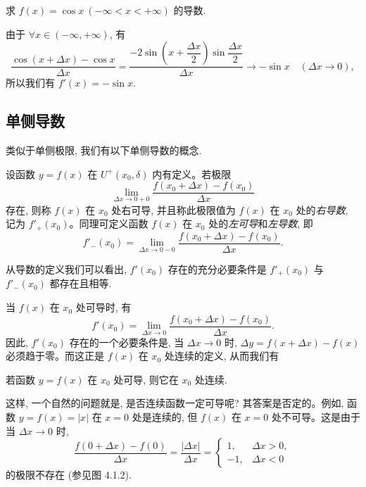 \begin{example}\label{example:ma-4-1-7}
求 $f(x)=\cos x\ (-\infty<x<+\infty)$ 的导数.
\end{example}


\begin{solve}
由于 $\forall x\in(-\infty,+\infty)$, 有
\[
  \frac{\cos(x+\Delta x)-\cos x}{\Delta x}
  =
  \frac{-2\sin\left(x+\dfrac{\Delta x}{2}\right)\sin\dfrac{\Delta x}{2}}
       {\Delta x}
  \to
  -\sin x\quad(\Delta x\to0),
\]
所以我们有 $f'(x)=-\sin x$.
\end{solve}


\subsection{单侧导数}
\label{subsec:ma-4-1-3}

类似于单侧极限, 我们有以下单侧导数的概念.

\begin{definition}\label{definition:ma-4-1-2}
设函数 $y=f(x)$ 在 $U^+(x_0,\delta)$ 内有定义。若极限
\[
  \lim_{\Delta x\to0+0}
  \frac{f(x_0+\Delta x)-f(x_0)}{\Delta x}
\]
存在, 则称 $f(x)$ 在 $x_0$ 处右可导, 并且称此极限值为 $f(x)$ 在 $x_0$ 处的\emph{右导数}, 记为 $f'_+(x_0)$。同理可定义函数 $f(x)$ 在 $x_0$ 处的\emph{左可导}和\emph{左导数}, 即
\[
  f'_-(x_0)=
  \lim_{\Delta x\to0-0}
  \frac{f(x_0+\Delta x)-f(x_0)}{\Delta x}.
\]
\end{definition}


\begin{remark}\label{remark:ma-4-source-17}
从导数的定义我们可以看出, $f'(x_0)$ 存在的充分必要条件是 $f'_+(x_0)$ 与 $f'_-(x_0)$ 都存在且相等.
\end{remark}

当 $f(x)$ 在 $x_0$ 处可导时, 有
\[
  f'(x_0)=
  \lim_{\Delta x\to0}
  \frac{f(x_0+\Delta x)-f(x_0)}{\Delta x}.
\]
因此, $f'(x_0)$ 存在的一个必要条件是, 当 $\Delta x\to0$ 时, $\Delta y=f(x+\Delta x)-f(x)$ 必须趋于零。而这正是 $f(x)$ 在 $x_0$ 处连续的定义, 从而我们有

\begin{theorem}\label{theorem:ma-4-1-1}
若函数 $y=f(x)$ 在 $x_0$ 处可导, 则它在 $x_0$ 处连续.
\end{theorem}

这样, 一个自然的问题就是, 是否连续函数一定可导呢? 其答案是否定的。例如, 函数 $y=f(x)=|x|$ 在 $x=0$ 处是连续的, 但 $f(x)$ 在 $x=0$ 处不可导。这是由于当 $\Delta x\to0$ 时,
\[
  \frac{f(0+\Delta x)-f(0)}{\Delta x}
  =
  \frac{|\Delta x|}{\Delta x}
  =
  \begin{cases}
    1, & \Delta x>0,\\
    -1, & \Delta x<0
  \end{cases}
\]
的极限不存在 (参见图 4.1.2).

